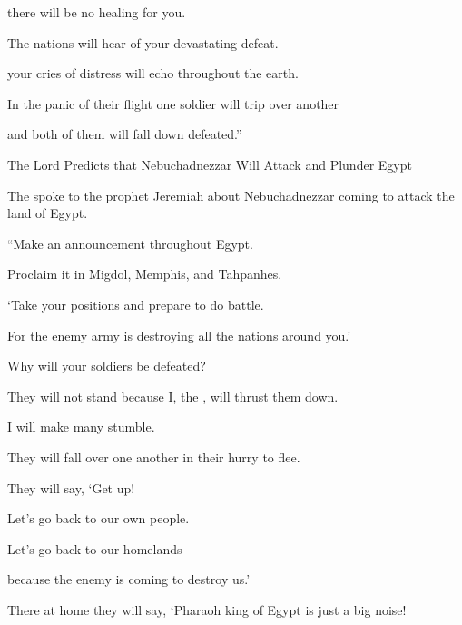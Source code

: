 {\par }{\Q there will be no
healing for you.
\par }{\Q {}The nations
will hear
of your devastating defeat.
\par }{\Q your cries of distress
will echo throughout
the earth.
\par }{\Q In the panic of their flight one soldier
will trip over
another
\par }{\Q and both
of them will fall down defeated.”
\par }{\SH The Lord Predicts that Nebuchadnezzar Will Attack and Plunder Egypt
\par }{\PP {}The
{}
spoke
to
the prophet
Jeremiah
about Nebuchadnezzar
coming
to attack
the land
of Egypt.
\par }{\Q {}“Make an announcement
throughout Egypt.
\par }{\Q Proclaim
it in Migdol,
Memphis,
and Tahpanhes.
\par }{\Q ‘Take your positions
and prepare
to do battle.
\par }{\Q For
the enemy army
is destroying
all the nations around you.’
\par }{\Q {}Why
will your soldiers be defeated?

\par }{\Q They will not
stand
because
I, the
{}, will thrust them down.
\par }{\Q {}I will make many
stumble.
\par }{\Q They will fall
over one
another
in their hurry
to flee.
\par }{\Q They will say,
‘Get
up!
\par }{\Q Let’s
go back
to our own
people.
\par }{\Q Let’s go
back to
our
homelands
\par }{\Q because the enemy
is coming
to
destroy
us.’
\par }{\Q {}There
at
home they will say, ‘Pharaoh
king
of Egypt
is just a big noise!

}
